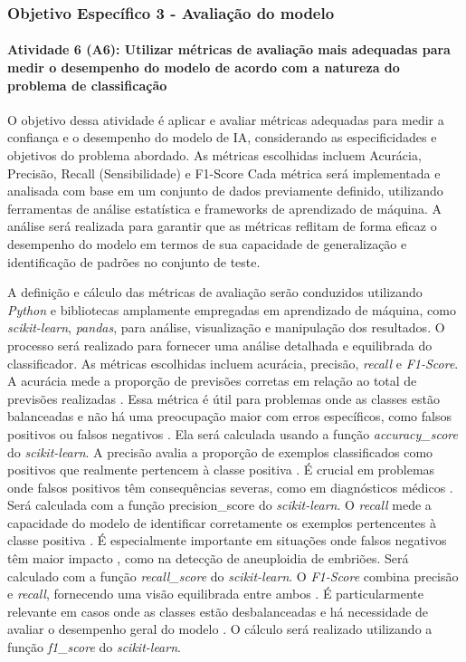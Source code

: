 \subsubsection{\textbf{Objetivo Específico 3} - Avaliação do modelo}

\paragraph{\textbf{Atividade 6 (A6):} Utilizar métricas de avaliação mais adequadas para medir o desempenho do modelo de acordo com a natureza do problema de classificação}

O objetivo dessa atividade é aplicar e avaliar métricas adequadas para medir a confiança e o desempenho do modelo de IA, considerando as especificidades e objetivos do problema abordado. As métricas escolhidas incluem Acurácia, Precisão, Recall (Sensibilidade) e F1-Score Cada métrica será implementada e analisada com base em um conjunto de dados previamente definido, utilizando ferramentas de análise estatística e frameworks de aprendizado de máquina. A análise será realizada para garantir que as métricas reflitam de forma eficaz o desempenho do modelo em termos de sua capacidade de generalização e identificação de padrões no conjunto de teste.

A definição e cálculo das métricas de avaliação serão conduzidos utilizando \textit{Python} e bibliotecas amplamente empregadas em aprendizado de máquina, como \textit{scikit-learn}, \textit{pandas}, para análise, visualização e manipulação dos resultados. O processo será realizado para fornecer uma análise detalhada e equilibrada do classificador. As métricas escolhidas incluem acurácia, precisão, \textit{recall} e \textit{F1-Score}. A acurácia mede a proporção de previsões corretas em relação ao total de previsões realizadas \cite{vilela2022}. Essa métrica é útil para problemas onde as classes estão balanceadas e não há uma preocupação maior com erros específicos, como falsos positivos ou falsos negativos \cite{vilela2022}. Ela será calculada usando a função \textit{accuracy\_score} do \textit{scikit-learn}. A precisão avalia a proporção de exemplos classificados como positivos que realmente pertencem à classe positiva \cite{vilela2022}. É crucial em problemas onde falsos positivos têm consequências severas, como em diagnósticos médicos \cite{vilela2022}. Será calculada com a função precision\_score do \textit{scikit-learn}. O \textit{recall} mede a capacidade do modelo de identificar corretamente os exemplos pertencentes à classe positiva \cite{vilela2022}. É especialmente importante em situações onde falsos negativos têm maior impacto \cite{vilela2022}, como na detecção de aneuploidia de embriões. Será calculado com a função \textit{recall\_score} do \textit{scikit-learn}. O \textit{F1-Score} combina precisão e \textit{recall}, fornecendo uma visão equilibrada entre ambos \cite{vilela2022}. É particularmente relevante em casos onde as classes estão desbalanceadas e há necessidade de avaliar o desempenho geral do modelo \cite{vilela2022}. O cálculo será realizado utilizando a função \textit{f1\_score} do \textit{scikit-learn}.

